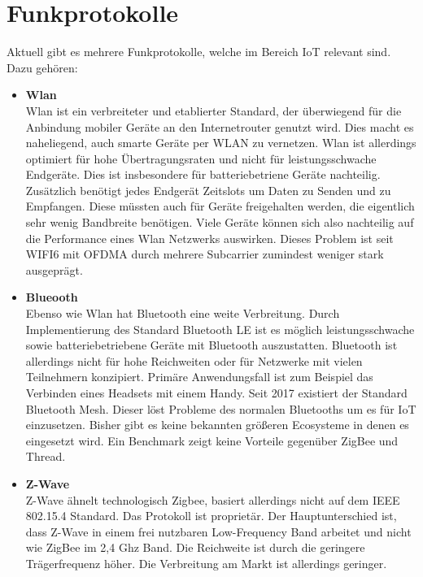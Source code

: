 \section{Funkprotokolle}
Aktuell gibt es mehrere Funkprotokolle, welche im Bereich IoT relevant sind. Dazu gehören:
\begin{itemize}
    \item \textbf{Wlan} \\
    Wlan ist ein verbreiteter und etablierter Standard, der überwiegend für die Anbindung mobiler Geräte an den
    Internetrouter genutzt wird. Dies macht es naheliegend, auch smarte Geräte per WLAN zu vernetzen. Wlan ist allerdings 
    optimiert für hohe Übertragungsraten und nicht für leistungsschwache Endgeräte. Dies ist
    insbesondere für batteriebetriene Geräte nachteilig. Zusätzlich benötigt jedes Endgerät Zeitslots um Daten zu Senden und zu Empfangen. Diese müssten auch für Geräte freigehalten werden, die eigentlich
    sehr wenig Bandbreite benötigen. Viele Geräte können sich also nachteilig auf die Performance eines Wlan Netzwerks auswirken. Dieses Problem ist seit WIFI6 mit OFDMA durch mehrere Subcarrier 
    zumindest weniger stark ausgeprägt.

    \item \textbf{Blueooth}\\
    Ebenso wie Wlan hat Bluetooth eine weite Verbreitung. Durch Implementierung 
    des Standard Bluetooth LE ist es möglich leistungsschwache sowie batteriebetriebene Geräte mit Bluetooth auszustatten. Bluetooth
    ist allerdings nicht für hohe Reichweiten oder für Netzwerke mit vielen Teilnehmern konzipiert. Primäre Anwendungsfall ist zum Beispiel das Verbinden eines Headsets mit 
    einem Handy. Seit 2017 existiert der Standard \grqq Bluetooth Mesh\grqq. Dieser löst Probleme des normalen Bluetooths um es für IoT einzusetzen. Bisher gibt es keine bekannten
    größeren Ecosysteme in denen es eingesetzt wird. Ein Benchmark zeigt keine Vorteile gegenüber ZigBee und Thread. \cite{sila}

    \item \textbf{Z-Wave}\\
    Z-Wave \cite{zwave} ähnelt technologisch Zigbee, basiert allerdings nicht auf dem IEEE 802.15.4 Standard. Das Protokoll ist proprietär. Der Hauptunterschied 
    ist, dass Z-Wave in einem frei nutzbaren Low-Frequency Band arbeitet und nicht wie ZigBee im 2,4 Ghz Band. Die Reichweite ist durch die geringere 
    Trägerfrequenz höher. Die Verbreitung am Markt ist allerdings geringer.


\end{itemize}
